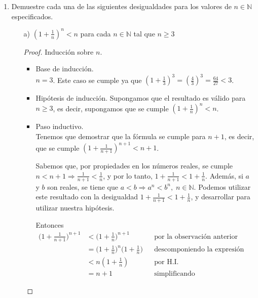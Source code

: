 \documentclass[letterpaper,11pt]{article}
\begin{document}
\begin{enumerate}
    \item Demuestre cada una de las siguientes desigualdades para los valores
    de $n \in ℕ$ especificados.
    \begin{itemize}
        \item[a)] $(1 + \frac{1}{n})^{n} < n$ para cada $n \in ℕ$ tal que 
        $n \geq 3$

        \begin{proof}
            Inducción sobre $n$.
            \begin{itemize}
                \item Base de inducción. \\
                $n = 3$. Este caso se cumple ya que 
                $(1 + \frac{1}{3})^{3} = (\frac{4}{3})^{3} = \frac{64}{27} < 3$.

                \item Hipótesis de inducción. Supongamos que el resultado es 
                válido para $n \geq 3$, es decir, supongamos que se cumple 
                $(1 + \frac{1}{n})^{n} < n$.

                \item Paso inductivo. \\ 
                Tenemos que demostrar que la fórmula se cumple para $n + 1$, es 
                decir, que se cumple $(1 + \frac{1}{n+1})^{n+1} < n+1$.
                
                Sabemos que, por propiedades en los números reales, se cumple 
                $n < n+1 ⇒ \frac{1}{n+1} < \frac{1}{n}$, y por lo tanto, 
                $1 + \frac{1}{n+1} < 1 + \frac{1}{n}$. Además, si $a$ y $b$
                son reales, se tiene que $a < b ⇒ a^{n} < b^{n}, \; n \in ℕ$.
                Podemos utilizar este resultado con la desigualdad 
                $1 + \frac{1}{n+1} < 1 + \frac{1}{n}$, y desarrollar para  
                utilizar nuestra hipótesis.
                
                Entonces 
                \begin{align*}
                    \bigg(1 + \frac{1}{n + 1}\bigg )^{n+1} 
                    &< \bigg (1 + \frac{1}{n} \bigg)^{n+1}
                    && \text{por la observación anterior} \\ 
                    &= \bigg (1 + \frac{1}{n} \bigg)^{n} 
                    \bigg(1 + \frac{1}{n} \bigg) 
                    && \text{descomponiendo la expresión anterior} \\
                    &< n (1 + \frac{1}{n})
                    && \text{por H.I.} \\ 
                    &= n + 1
                    && \text{simplificando}
                \end{align*}
            \end{itemize}
        \end{proof}


\end{itemize}
\end{enumerate}
\end{document}
